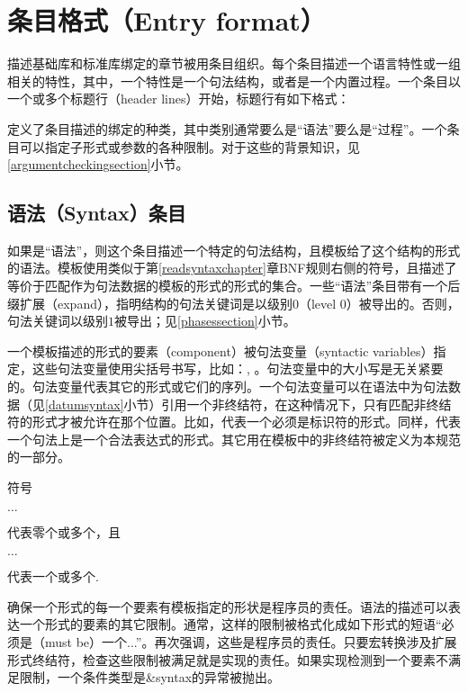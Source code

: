 \chapter{条目格式（Entry format）}
\label{entryformatchapter}

描述基础库和标准库绑定的章节被用条目组织。每个条目描述一个语言特性或一组相关的特性，其中，一个特性是一个句法结构，或者是一个内置过程。一个条目以一个或多个标题行（header lines）开始，标题行有如下格式：

\noindent{}\unpenalty

定义了条目描述的绑定的种类，其中类别通常要么是“语法”要么是“过程”。一个条目可以指定子形式或参数的各种限制。对于这些的背景知识，见\ref{argumentcheckingsection}小节。

\section{语法（Syntax）条目}

如果是“语法”，则这个条目描述一个特定的句法结构，且模板给了这个结构的形式的语法。模板使用类似于第\ref{readsyntaxchapter}章BNF规则右侧的符号，且描述了等价于匹配作为句法数据的模板的形式的形式的集合。一些“语法”条目带有一个后缀{\cf 扩展（expand）}，指明结构的句法关键词是以级别$0$（level $0$）被导出的。否则，句法关键词以级别$1$被导出；见\ref{phasessection}小节。

一个模板描述的形式的要素（component）被句法变量（syntactic variables）指定，这些句法变量使用尖括号书写，比如：, 。句法变量中的大小写是无关紧要的。句法变量代表其它的形式或它们的序列。一个句法变量可以在语法中为句法数据（见\ref{datumsyntax}小节）引用一个非终结符，在这种情况下，只有匹配非终结符的形式才被允许在那个位置。比如，代表一个必须是标识符的形式。同样，代表一个句法上是一个合法表达式的形式。其它用在模板中的非终结符被定义为本规范的一部分。

符号
\begin{tabbing}
\qquad {} $\ldots$
\end{tabbing}
代表零个或多个，且
\begin{tabbing}
\qquad {}  $\ldots$
\end{tabbing}
代表一个或多个.

确保一个形式的每一个要素有模板指定的形状是程序员的责任。语法的描述可以表达一个形式的要素的其它限制。通常，这样的限制被格式化成如下形式的短语“必须是（must be）一个...”。再次强调，这些是程序员的责任。只要宏转换涉及扩展形式终结符，检查这些限制被满足就是实现的责任。如果实现检测到一个要素不满足限制，一个条件类型是{\cf\&syntax}的异常被抛出。

